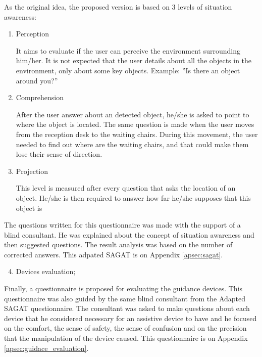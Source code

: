         As the original idea, the proposed version is based on 3 levels of situation awareness:

        \begin{enumerate}[leftmargin = 6em, label = Level \arabic* -- ]
            \item Perception
            
            It aims to evaluate if the user can perceive the environment surrounding him/her. It is not expected that the user details about all the objects in the environment, only about some key objects. Example: ”Is there an object around you?”

            \item Comprehension
    
            After the user answer about an detected object, he/she is asked to point to where the object is located. The same question is made when the user moves from the reception desk to the waiting chairs. During this movement, the user needed to find out where are the waiting chairs, and that could make them lose their sense of direction.
    
            \item Projection
            
            This level is measured after every question that asks the location of an object. He/she is then required to answer how far he/she supposes that this object is
            
        \end{enumerate}      

        The questions written for this questionnaire was made with the support of a blind consultant. He was explained about the concept of situation awareness and then suggested questions. The result analysis was based on the number of corrected answers. This adpated SAGAT is on Appendix \ref{apsec:sagat}.

        \begin{enumerate} [label = \Alph*)]
            \setcounter{enumi}{3}
            \item Devices evaluation;
        \end{enumerate}

        Finally, a questionnaire is proposed for evaluating the guidance devices. This questionnaire was also guided by the same blind consultant from the Adapted SAGAT questionnaire. The consultant was asked to make questions about each device that he considered necessary for an assistive device to have and he focused on the comfort, the sense of safety, the sense of confusion and on the precision that the manipulation of the device caused. This questionnaire is on Appendix \ref{apsec:guidace_evaluation}.
        
